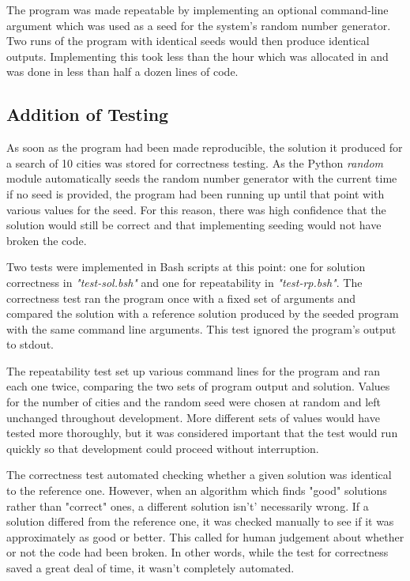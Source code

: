 \documentclass[11pt, oneside]{article}   %
\begin{document}
The program was made repeatable by implementing an optional command-line argument which was used as a seed for the system's random number generator.
Two runs of the program with identical seeds would then produce identical outputs.
Implementing this took less than the hour which was allocated in \cite{ref:Part-I} and was done in less than half a dozen lines of code.

\subsection{Addition of Testing}
As soon as the program had been made reproducible, the solution it produced for a search of 10 cities was stored for correctness testing.
As the Python {\em random} module automatically seeds the random number generator with the current time if no seed is provided, the program had been running up until that point with various values for the seed.
For this reason, there was high confidence that the solution would still be correct and that implementing seeding would not have broken the code.

Two tests were implemented in Bash scripts at this point: one for solution correctness in {\em "test-sol.bsh"} and one for repeatability in {\em "test-rp.bsh"}.
The correctness test ran the program once with a fixed set of arguments and compared the solution with a reference solution produced by the seeded program with the same command line arguments.
This test ignored the program's output to stdout.

The repeatability test set up various command lines for the program and ran each one twice, comparing the two sets of program output and solution.
Values for the number of cities and the random seed were chosen at random and left unchanged throughout development.
More different sets of values would have tested more thoroughly, but it was considered important that the test would run quickly so that development could proceed without interruption.

The correctness test automated checking whether a given solution was identical to the reference one.
However, when an algorithm which finds "good" solutions rather than "correct" ones, a different solution isn't' necessarily wrong.
If a solution differed from the reference one, it was checked manually to see if it was approximately as good or better.
This called for human judgement about whether or not the code had been broken.
In other words, while the test for correctness saved a great deal of time, it wasn't completely automated.
\end{document}
